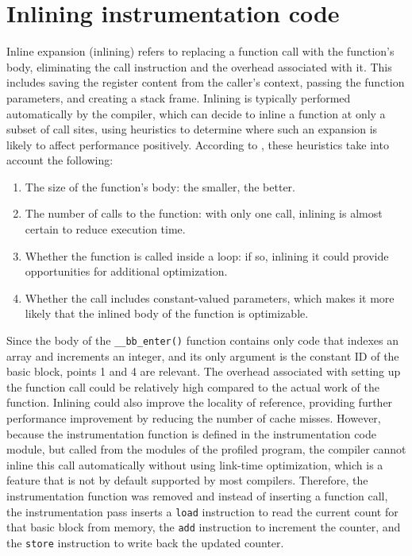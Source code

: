 \section{Inlining instrumentation code}
\label{inlining}
Inline expansion (inlining) refers to replacing a function call with the function's body, eliminating the call instruction and the overhead associated with it. This includes saving the register content from the caller's context, passing the function parameters, and creating a stack frame. Inlining is typically performed automatically by the compiler, which can decide to inline a function at only a subset of call sites, using heuristics to determine where such an expansion is likely to affect performance positively. According to \cite{advanced-compiler-design}, these heuristics take into account the following:

\begin{enumerate}
    \item The size of the function's body: the smaller, the better.
    \item The number of calls to the function: with only one call, inlining is almost certain to reduce execution time.
    \item Whether the function is called inside a loop: if so, inlining it could provide opportunities for additional optimization.
    \item Whether the call includes constant-valued parameters, which makes it more likely that the inlined body of the function is optimizable.
\end{enumerate}

Since the body of the  \verb|__bb_enter()| function contains only code that indexes an array and increments an integer, and its only argument is the constant ID of the basic block, points 1 and 4 are relevant. The overhead associated with setting up the function call could be relatively high compared to the actual work of the function. Inlining could also improve the locality of reference, providing further performance improvement by reducing the number of cache misses. \cite{inline-func} However, because the instrumentation function is defined in the instrumentation code module, but called from the modules of the profiled program, the compiler cannot inline this call automatically without using link-time optimization, which is a feature that is not by default supported by most compilers. Therefore, the instrumentation function was removed and instead of inserting a function call, the instrumentation pass inserts a \verb|load| instruction to read the current count for that basic block from memory, the \verb|add| instruction to increment the counter, and the \verb|store| instruction to write back the updated counter. 

